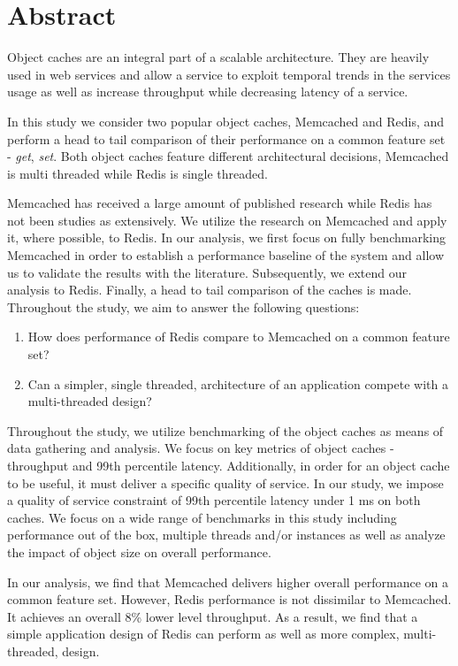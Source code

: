 \section{Abstract}
Object caches are an integral part of a scalable architecture. They are heavily used in web services and allow a service to exploit temporal trends in the services usage as well as increase throughput while decreasing latency of a service.

In this study we consider two popular object caches, Memcached and Redis, and perform a head to tail comparison of their performance on a common feature set - \textit{get}, \textit{set}. Both object caches feature different architectural decisions, Memcached is multi threaded while Redis is single threaded.

Memcached has received a large amount of published research while Redis has not been studies as extensively. We utilize the research on Memcached and apply it, where possible, to Redis. In our analysis, we first focus on fully benchmarking Memcached in order to establish a performance baseline of the system and allow us to validate the results with the literature. Subsequently, we extend our analysis to Redis. Finally, a head to tail comparison of the caches is made. Throughout the study, we aim to answer the following questions:

\begin{enumerate}
  \item How does performance of Redis compare to Memcached on a common feature set?
  \item Can a simpler, single threaded, architecture of an application compete with a multi-threaded design?
\end{enumerate}

Throughout the study, we utilize benchmarking of the object caches as means of data gathering and analysis. We focus on key metrics of object caches - throughput and 99th percentile latency. Additionally, in order for an object cache to be useful, it must deliver a specific quality of service. In our study, we impose a quality of service constraint of 99th percentile latency under 1 ms on both caches. We focus on a wide range of benchmarks in this study including performance out of the box, multiple threads and/or instances as well as analyze the impact of object size on overall performance.

In our analysis, we find that Memcached delivers higher overall performance on a common feature set. However, Redis performance is not dissimilar to Memcached. It achieves an overall 8\% lower level throughput. As a result, we find that a simple application design of Redis can perform as well as more complex, multi-threaded, design.

